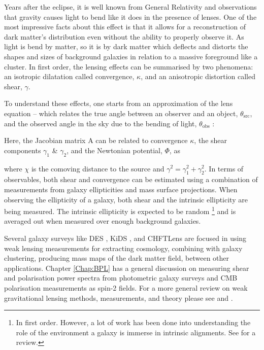 \qquad Years after the eclipse, it is well known from General Relativity and observations that gravity causes light to bend like it does in the presence of lenses. One of the most impressive facts about this effect is that it allows for a reconstruction of dark matter's distribution even without the ability to properly observe it. As light is bend by matter, so it is by dark matter which deflects and distorts the shapes and sizes of background galaxies in relation to a massive foreground like a cluster. In first order, the lensing effects can be summarised by two phenomena: an isotropic dilatation called convergence, $\kappa$, and an anisotropic distortion called shear, $\gamma$. 

\qquad To understand these effects, one starts from an approximation of the lens equation -- which relates the true angle between an observer and an object, $\theta_{\text{src}}$, and the observed angle in the sky due to the bending of light, $\theta_{\text{obs}}$ \citep{dods}:

Here, the Jacobian matrix A can be related to convergence $\kappa$, the shear components $\gamma_1$ \& $\gamma_2$, and the Newtonian potential, $\Phi$, as

where $\chi$ is the comoving distance to the source and $\gamma^2 = \gamma_1^2 + \gamma_2^2$. In terms of observables, both shear and convergence can be estimated using a combination of measurements from galaxy ellipticities and mass surface projections. When observing the ellipticity of a galaxy, both shear and the intrinsic ellipticity are being measured. The intrinsic ellipticity is expected to be random \footnote{In first order. However, a lot of work has been done into understanding the role of the environment a galaxy is immerse in intrinsic alignments. See \cite{2015Kirk_IA} for a review.} and is averaged out when measured over enough background galaxies. 

\qquad Several galaxy surveys like DES \citep{2017arXiv170801530D}, KiDS \citep{2017MNRAS.465.1454H}, and CHFTLens \citep{2014CHFTLens} are focused in using weak lensing measurements for extracting cosmology, combining with galaxy clustering, producing mass maps of the dark matter field, between other applications. Chapter \ref{Chap:BPL} has a general discussion on measuring shear and polarisation power spectra from photometric galaxy surveys and CMB polarisation measurements as spin-2 fields. For a more general review on weak gravitational lensing methods, measurements, and theory please see \cite{2005astro.ph..9252S} and \cite{2017SchpJ..1232440B}.


